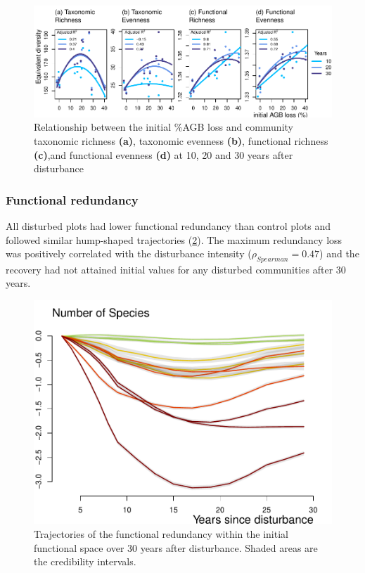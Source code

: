 \documentclass[
  11pt,
  french,
  A4paper,
  extrafontsizes,onecolumn,openright
  ]{memoir}
\begin{document}
\begin{figure}

{\centering \includegraphics[width=1\linewidth]{Manuscript_files/figure-latex/IDHplot-1} 

}

\caption{Relationship between the initial \%AGB loss and community taxonomic richness \textbf{(a)}, taxonomic evenness \textbf{(b)}, functional richness \textbf{(c)},and functional evenness \textbf{(d)} at 10, 20 and 30 years after disturbance}\label{fig:IDHplot}
\end{figure}

\subsubsection{Functional redundancy}\label{functional-redundancy}

All disturbed plots had lower functional redundancy than control plots
and followed similar hump-shaped trajectories (\ref{fig:RedFunRest}).
The maximum redundancy loss was positively correlated with the
disturbance intensity (\(\rho_{Spearman}=0.47\)) and the recovery had
not attained initial values for any disturbed communities after 30
years.

\begin{figure}

{\centering \includegraphics[width=0.6\linewidth]{Manuscript_files/figure-latex/RedFunRest-1} 

}

\caption{Trajectories of the functional redundancy within the initial functional space over 30 years after disturbance. Shaded areas are the credibility intervals.}\label{fig:RedFunRest}
\end{figure}
\end{document}
